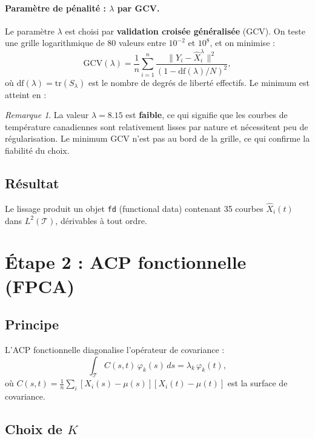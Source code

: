 \documentclass[11pt, a4paper]{article}
\newcommand{\Ltwo}{L^2(\mathcal{T})}
\theoremstyle{definition}
\theoremstyle{remark}
\newtheorem{remarque}{Remarque}[section]
\begin{document}
\paragraph{Paramètre de pénalité : $\lambda$ par GCV.}
Le paramètre $\lambda$ est choisi par \textbf{validation croisée généralisée}
(GCV). On teste une grille logarithmique de 80 valeurs entre $10^{-2}$ et
$10^{8}$, et on minimise :
\[
  \text{GCV}(\lambda) = \frac{1}{n} \sum_{i=1}^{n}
  \frac{\| Y_i - \hat{X}_i^\lambda \|^2}{(1 - \text{df}(\lambda)/N)^2},
\]
où $\text{df}(\lambda) = \text{tr}(S_\lambda)$ est le nombre de degrés de
liberté effectifs. Le minimum est atteint en :

\begin{center}
\end{center}

\begin{remarque}
La valeur $\lambda = 8.15$ est \textbf{faible}, ce qui signifie que les courbes
de température canadiennes sont relativement lisses par nature et nécessitent
peu de régularisation. Le minimum GCV n'est pas au bord de la grille, ce qui
confirme la fiabilité du choix.
\end{remarque}

\subsection{Résultat}

Le lissage produit un objet \texttt{fd} (functional data) contenant 35 courbes
$\hat{X}_i(t)$ dans $\Ltwo$, dérivables à tout ordre.

\section{Étape 2 : ACP fonctionnelle (FPCA)}
\label{sec:fpca}

\subsection{Principe}

L'ACP fonctionnelle diagonalise l'opérateur de covariance :
\[
  \int_{\mathcal{T}} C(s,t) \, \varphi_k(s) \, ds = \lambda_k \, \varphi_k(t),
\]
où $C(s,t) = \frac{1}{n} \sum_i [X_i(s) - \mu(s)][X_i(t) - \mu(t)]$ est la
surface de covariance.

\subsection{Choix de $K$}
\end{document}
